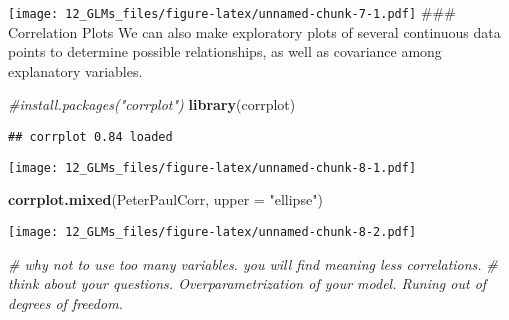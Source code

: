 \documentclass[]{article}
\newenvironment{Shaded}{\begin{snugshade}}{\end{snugshade}}
\newcommand{\KeywordTok}[1]{\textcolor[rgb]{0.13,0.29,0.53}{\textbf{#1}}}
\newcommand{\DataTypeTok}[1]{\textcolor[rgb]{0.13,0.29,0.53}{#1}}
\newcommand{\StringTok}[1]{\textcolor[rgb]{0.31,0.60,0.02}{#1}}
\newcommand{\CommentTok}[1]{\textcolor[rgb]{0.56,0.35,0.01}{\textit{#1}}}
\newcommand{\OperatorTok}[1]{\textcolor[rgb]{0.81,0.36,0.00}{\textbf{#1}}}
\newcommand{\NormalTok}[1]{#1}
\begin{document}
\texttt{[image: 12\_GLMs\_files/figure-latex/unnamed-chunk-7-1.pdf]}
\#\#\# Correlation Plots We can also make exploratory plots of several
continuous data points to determine possible relationships, as well as
covariance among explanatory variables.

\begin{Shaded}
\begin{Highlighting}[]
\CommentTok{#install.packages("corrplot")}
\KeywordTok{library}\NormalTok{(corrplot)}
\end{Highlighting}
\end{Shaded}

\begin{verbatim}
## corrplot 0.84 loaded
\end{verbatim}

\begin{Shaded}
\end{Shaded}

\texttt{[image: 12\_GLMs\_files/figure-latex/unnamed-chunk-8-1.pdf]}

\begin{Shaded}
\begin{Highlighting}[]
\KeywordTok{corrplot.mixed}\NormalTok{(PeterPaulCorr, }\DataTypeTok{upper =} \StringTok{"ellipse"}\NormalTok{)}
\end{Highlighting}
\end{Shaded}

\texttt{[image: 12\_GLMs\_files/figure-latex/unnamed-chunk-8-2.pdf]}

\begin{Shaded}
\begin{Highlighting}[]
\CommentTok{# why not to use too many variables. you will find meaning less correlations. }
\CommentTok{# think about your questions. Overparametrization of your model. Runing out of degrees of freedom.}
\end{Highlighting}
\end{Shaded}
\end{document}
